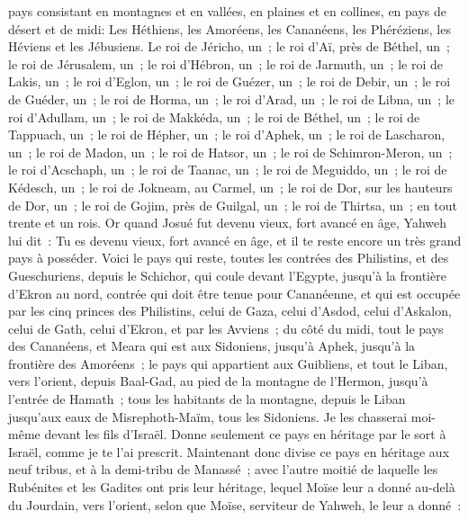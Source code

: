 \begin{multicols}{2}
pays consistant en montagnes et en vallées, en plaines et en collines, en pays de désert et de midi: Les Héthiens, les Amoréens, les Cananéens, les Phéréziens, les Héviens et les Jébusiens.
Le roi de Jéricho, un~; le roi d'Aï, près de Béthel, un~;
le roi de Jérusalem, un~; le roi d'Hébron, un~;
le roi de Jarmuth, un~; le roi de Lakis, un~;
le roi d'Eglon, un~; le roi de Guézer, un~;
le roi de Debir, un~; le roi de Guéder, un~;
le roi de Horma, un~; le roi d'Arad, un~;
le roi de Libna, un~; le roi d'Adullam, un~;
le roi de Makkéda, un~; le roi de Béthel, un~;
le roi de Tappuach, un~; le roi de Hépher, un~;
le roi d'Aphek, un~; le roi de Lascharon, un~;
le roi de Madon, un~; le roi de Hatsor, un~;
le roi de Schimron-Meron, un~; le roi d'Acschaph, un~;
le roi de Taanac, un~; le roi de Meguiddo, un~;
le roi de Kédesch, un~; le roi de Jokneam, au Carmel, un~;
le roi de Dor, sur les hauteurs de Dor, un~; le roi de Gojim, près de Guilgal, un~;
le roi de Thirtsa, un~; en tout trente et un rois.
\VerseOne{}Or quand Josué fut devenu vieux, fort avancé en âge, Yahweh lui dit~: Tu es devenu vieux, fort avancé en âge, et il te reste encore un très grand pays à posséder.
Voici le pays qui reste, toutes les contrées des Philistins, et des Gueschuriens,
depuis le Schichor, qui coule devant l'Egypte, jusqu'à la frontière d'Ekron au nord, contrée qui doit être tenue pour Cananéenne, et qui est occupée par les cinq princes des Philistins, celui de Gaza, celui d'Asdod, celui d'Askalon, celui de Gath, celui d'Ekron, et par les Avviens~;
du côté du midi, tout le pays des Cananéens, et Meara qui est aux Sidoniens, jusqu'à Aphek, jusqu'à la frontière des Amoréens~;
le pays qui appartient aux Guibliens, et tout le Liban, vers l'orient, depuis Baal-Gad, au pied de la montagne de l'Hermon, jusqu'à l'entrée de Hamath~;
tous les habitants de la montagne, depuis le Liban jusqu'aux eaux de Misrephoth-Maïm, tous les Sidoniens. Je les chasserai moi-même devant les fils d'Israël. Donne seulement ce pays en héritage par le sort à Israël, comme je te l'ai prescrit.
Maintenant donc divise ce pays en héritage aux neuf tribus, et à la demi-tribu de Manassé~;
avec l'autre moitié de laquelle les Rubénites et les Gadites ont pris leur héritage, lequel Moïse leur a donné au-delà du Jourdain, vers l'orient, selon que Moïse, serviteur de Yahweh, le leur a donné~:

\end{multicols}
